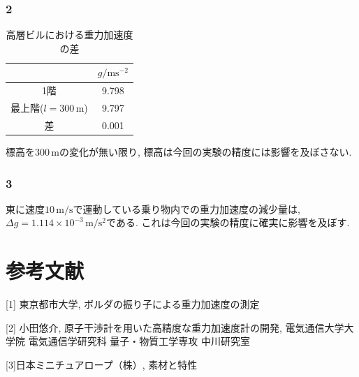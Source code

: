 \documentclass{jarticle}
\begin{document}
\subsubsection{\textcircled{\scriptsize 2}}

\begin{table}[H]
  \centering
  \caption{高層ビルにおける重力加速度の差}
  \begin{tabular}{cc}
    \hline
    & $g/\mathrm{ms^{-2}}$ \\
    \hline
    1階 & 9.798 \\
    最上階($l=300\,\mathrm{m}$) & 9.797 \\
    \hline
    差 & 0.001 \\
    \hline
  \end{tabular}
\end{table}

標高を$300\,\mathrm{m}$の変化が無い限り, 標高は今回の実験の精度には影響を及ぼさない.


\subsubsection{\textcircled{\scriptsize 3}}

東に速度$10\,\mathrm{m/s}$で運動している乗り物内での重力加速度の減少量は, \\
$\Delta g=1.114\times10^{-3}\,\mathrm{m/s^2}$である. これは今回の実験の精度に確実に影響を及ぼす.


\section{参考文献}

[1] 東京都市大学, ボルダの振り子による重力加速度の測定

[2] 小田悠介, 原子干渉計を用いた高精度な重力加速度計の開発, 電気通信大学大学院 電気通信学研究科 量子・物質工学専攻 中川研究室

[3]日本ミニチュアロープ（株）, 素材と特性

  
\end{document}
